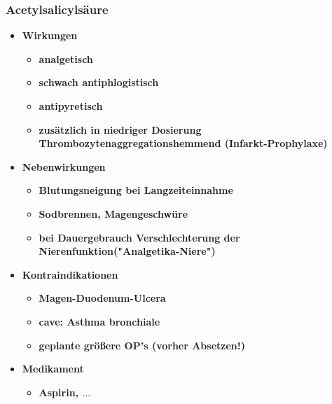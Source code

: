 \subsubsection{Acetylsalicylsäure}
	\begin{itemize}
		\item \textbf{Wirkungen}
			\begin{itemize}
				\item \textbf{analgetisch}
				\item \textbf{schwach antiphlogistisch}
				\item \textbf{antipyretisch}
				\item \textbf{zusätzlich in niedriger Dosierung Thrombozytenaggregationshemmend (Infarkt-Prophylaxe)}
			\end{itemize}
		\item \textbf{Nebenwirkungen}
			\begin{itemize}
				\item \textbf{Blutungsneigung bei Langzeiteinnahme}
				\item \textbf{Sodbrennen, Magengeschwüre}
				\item \textbf{bei Dauergebrauch Verschlechterung der Nierenfunktion("Analgetika-Niere")}
			\end{itemize}
		\item \textbf{Kontraindikationen}
			\begin{itemize}
				\item \textbf{Magen-Duodenum-Ulcera}
				\item \textbf{cave: Asthma bronchiale}
				\item \textbf{geplante größere OP's (vorher Absetzen!)}
			\end{itemize}
		\item \textbf{Medikament}
			\begin{itemize}
				\item \textbf{Aspirin\textregistered, $\dots$}
			\end{itemize}
	\end{itemize}
		

